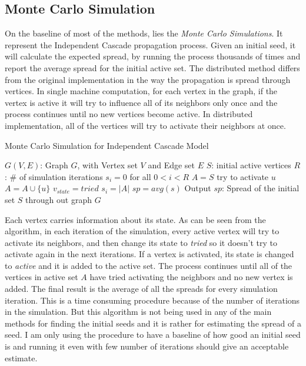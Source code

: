 \documentclass[english]{tktltiki}
\begin{document}
\subsection{Monte Carlo Simulation}
On the baseline of most of the methods, lies the \textit{Monte Carlo Simulations}. It represent the Independent Cascade propagation process. Given an initial seed, it will calculate the expected spread, by running the process thousands of times and report the average spread for the initial active set. The distributed method differs from the original implementation in the way the propagation is spread through vertices. In single machine computation, for each vertex in the graph, if the vertex is active it will try to influence all of its neighbors only once and the process continues until no new vertices become active. In distributed implementation, all of the vertices will try to activate their neighbors at once. 
\begin{algorithm}[ht!]
\caption{Monte Carlo Simulation for Independent Cascade Model}
\label{alg:simulation}
\begin{algorithmic}
\Require $G(V,E)$: Graph $G$, with Vertex set $V$ and Edge set $E$
\Require $S$: initial active vertices
\Require $R$: \# of simulation iterations
\State $s_i=0$ for all $0<i<R$
	\State $A=S$ 
				\State try to activate $u$
					\State $A=A\cup \{u\}$
				\EndIf
			\EndFor
			\State $v_{state} = tried$
		\EndIf
	\EndFor
	\State $s_i=|A|$	
\EndFor
\State $sp=avg(s)$
\State Output $sp$: Spread of the initial set $S$ through out graph $G$
\end{algorithmic}
\end{algorithm}
Each vertex carries information about its state. As can be seen from the algorithm, in each iteration of the simulation, every active vertex will try to activate its neighbors, and then change its state to \textit{tried} so it doesn't try to activate again in the next iterations. If a vertex is activated, its state is changed to \textit{active} and it is added to the active set. The process continues until all of the vertices in active set $A$ have tried activating the neighbors and no new vertex is added. The final result is the average of all the spreads for every simulation iteration. This is a time consuming procedure because of the number of iterations in the simulation. But this algorithm is not being used in any of the main methods for finding the initial seeds and it is rather for estimating the spread of a seed. I am only using the procedure to have a baseline of how good an initial seed is and running it even with few number of iterations should give an acceptable estimate.
\end{document}
